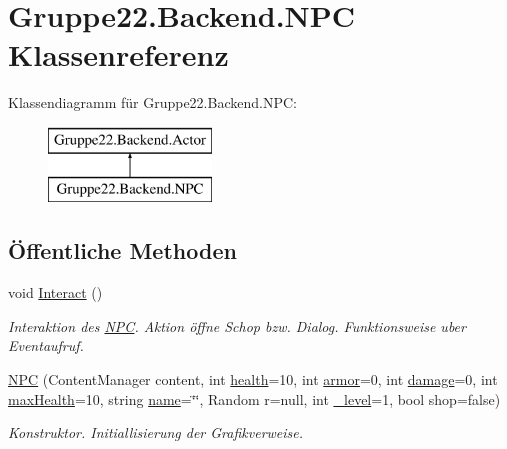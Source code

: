 \hypertarget{class_gruppe22_1_1_backend_1_1_n_p_c}{\section{Gruppe22.\-Backend.\-N\-P\-C Klassenreferenz}
\label{class_gruppe22_1_1_backend_1_1_n_p_c}
}
Klassendiagramm für Gruppe22.\-Backend.\-N\-P\-C\-:\begin{figure}[H]
\begin{center}
\leavevmode
\includegraphics[height=2.000000cm]{class_gruppe22_1_1_backend_1_1_n_p_c}
\end{center}
\end{figure}
\subsection*{Öffentliche Methoden}
\begin{DoxyCompactItemize}
\item 
void \hyperlink{class_gruppe22_1_1_backend_1_1_n_p_c_a8d78d66f0c812fa44a654688433d7db5}{Interact} ()
\begin{DoxyCompactList}\small\item\em Interaktion des \hyperlink{class_gruppe22_1_1_backend_1_1_n_p_c}{N\-P\-C}. Aktion öffne Schop bzw. Dialog. Funktionsweise uber Eventaufruf. \end{DoxyCompactList}\item 
\hyperlink{class_gruppe22_1_1_backend_1_1_n_p_c_ad228f41a3a754678a2f700455fec4db8}{N\-P\-C} (Content\-Manager content, int \hyperlink{class_gruppe22_1_1_backend_1_1_actor_a46f3a7d62de83a6bf3c44cd52f38af9b}{health}=10, int \hyperlink{class_gruppe22_1_1_backend_1_1_actor_ab400f0b82f96d2334891d7cd428f5d08}{armor}=0, int \hyperlink{class_gruppe22_1_1_backend_1_1_actor_a461e2480a59de23517c3b375dede10fb}{damage}=0, int \hyperlink{class_gruppe22_1_1_backend_1_1_actor_aac0f2f9a2f0b314f98ba19d0b38a7a97}{max\-Health}=10, string \hyperlink{class_gruppe22_1_1_backend_1_1_actor_a28129eaf9d70d9bfc33a29544ba74edf}{name}=\char`\"{}\char`\"{}, Random r=null, int \hyperlink{class_gruppe22_1_1_backend_1_1_actor_ace31c72a0fd9bb941df7112647dff86d}{\-\_\-level}=1, bool shop=false)
\begin{DoxyCompactList}\small\item\em Konstruktor. Initiallisierung der Grafikverweise. \end{DoxyCompactList}\end{DoxyCompactItemize}
